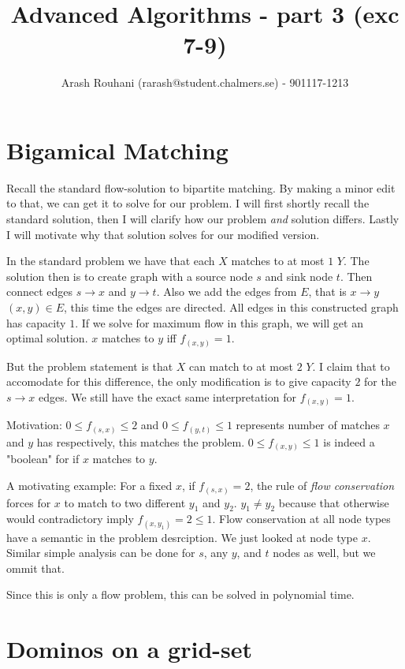 \documentclass[a4paper,11pt]{article}
\title{Advanced Algorithms - part 3 (exc 7-9)}
\author{Arash Rouhani (rarash@student.chalmers.se) - 901117-1213}
\begin{document}
\maketitle

\section{Bigamical Matching}

Recall the standard flow-solution to bipartite matching.
By making a minor edit to that, we can get it to solve for our problem.
I will first shortly recall the standard solution, then I will
clarify how our problem \emph{and} solution differs.
Lastly I will motivate why that solution solves for our modified version.

In the standard problem we have that each $X$ matches to at most $1$ $Y$.
The solution then is to create graph with a source node $s$ and
sink node $t$. Then connect edges $s \to x$ and $y \to t$. Also
we add the edges from $E$, that is $x \to y$ $(x,y) \in E$,
this time the edges are directed. All edges in this constructed graph
has capacity $1$.
If we solve for maximum flow in this graph, we will get an optimal
solution. $x$ matches to $y$ iff $f_{(x,y)} = 1$.

But the problem statement is that $X$ can match to at most $2$ $Y$.
I claim that to accomodate for this difference, the only modification
is to give capacity $2$ for the $s \to x$ edges.
We still have the exact same interpretation for $f_{(x,y)} = 1$.

Motivation: $0 \leq f_{(s, x)} \leq 2$ and $0 \leq f_{(y, t)} \leq 1$
represents number of matches $x$ and $y$ has respectively,
this matches the problem. $0 \leq f_{(x, y)} \leq 1$ is indeed
a "boolean" for if $x$ matches to $y$.

A motivating example: For a fixed
$x$, if $f_{(s, x)} = 2$, the rule of \emph{flow conservation}
forces for $x$ to match to two different $y_1$ and $y_2$.
$y_1 \neq y_2$ because that otherwise would contradictory imply
$f_{(x, y_1)} = 2 \leq 1$. Flow conservation
at all node types have a semantic in the problem desrciption.
We just looked at node type $x$. Similar simple analysis
can be done for $s$, any $y$, and $t$ nodes as well,
but we ommit that.

Since this is only a flow problem, this can be solved
in polynomial time.

\section{Dominos on a grid-set}
\end{document}
